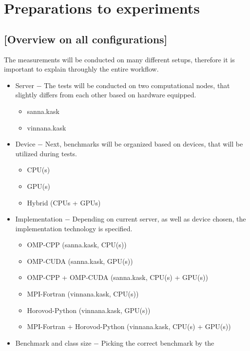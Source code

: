 \chapter{Preparations to experiments}

\section{[Overview on all configurations]}

The measurements will be conducted on many different setups, therefore it is
important to explain throughly the entire workflow.

\begin{itemize}
    \item Server $-$ The tests will be conducted on two computational
    nodes, that slightly differs from each other based on hardware equipped.
        \begin{itemize}
            \item sanna.kask
            \item vinnana.kask
        \end{itemize}
    \item Device $-$ Next, benchmarks will be organized based on devices,
    that will be utilized during tests.
        \begin{itemize}
            \item CPU\@(s)
            \item GPU\@(s)
            \item Hybrid (CPUs + GPUs)
        \end{itemize}
    \item Implementation $-$ Depending on current server, as well as device
    chosen, the implementation technology is specified.
        \begin{itemize}
            \item OMP-CPP (sanna.kask, CPU\@(s))
            \item OMP-CUDA (sanna.kask, GPU\@(s))
            \item OMP-CPP + OMP-CUDA (sanna.kask, CPU\@(s) + GPU\@(s))
            \item MPI-Fortran (vinnana.kask, CPU\@(s))
            \item Horovod-Python (vinnana.kask, GPU\@(s))
            \item MPI-Fortran + Horovod-Python (vinnana.kask, CPU\@(s) + GPU\@(s))
        \end{itemize}
    \item Benchmark and class size $-$ Picking the correct benchmark by the

\end{itemize}
